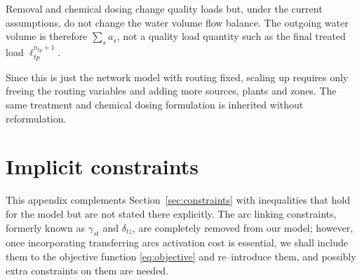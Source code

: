 \documentclass[10pt]{article}
\begin{document}
\begin{center}
\end{center}

Removal and chemical dosing change quality loads but, under the current assumptions, do not change the water volume flow balance.
The outgoing water volume is therefore $\sum_s a_s$, not a quality load quantity such as the final treated load $\ell^{n_{tp}+1}_{tp}$.

\noindent Since this is just the network model with routing fixed, scaling up requires only freeing the routing variables and adding more sources, plants and zones.
The same treatment and chemical dosing formulation is inherited without reformulation.

\clearpage



\clearpage
\appendix
\section{Implicit constraints}\label{sec:implicit_constraints}

This appendix complements Section~\ref{sec:constraints} with inequalities that hold for the model but are not stated there explicitly. 
The arc linking constraints, formerly known as $\gamma_{st}$ and $\delta_{tz}$, are completely removed from our model; however, once incorporating transferring arcs activation cost is essential, we shall include them to the objective function \eqref{eq:objective} and re–introduce them, and possibly extra constraints on them are needed.
\end{document}
